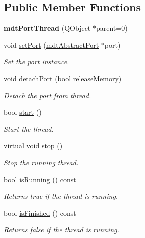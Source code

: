 \subsection*{Public Member Functions}
\begin{DoxyCompactItemize}
\item 
\hypertarget{classmdt_port_thread_aa20869c68d7a016f9e547464f0d8b71e}{
{\bfseries mdtPortThread} (QObject $\ast$parent=0)}
\label{classmdt_port_thread_aa20869c68d7a016f9e547464f0d8b71e}

\item 
void \hyperlink{classmdt_port_thread_acd51474c3a2683676423317bc9cb31b2}{setPort} (\hyperlink{classmdt_abstract_port}{mdtAbstractPort} $\ast$port)
\begin{DoxyCompactList}\small\item\em Set the port instance. \end{DoxyCompactList}\item 
void \hyperlink{classmdt_port_thread_a29b434534a5564efbd9dfe570a61b143}{detachPort} (bool releaseMemory)
\begin{DoxyCompactList}\small\item\em Detach the port from thread. \end{DoxyCompactList}\item 
bool \hyperlink{classmdt_port_thread_a9c45f260b8d58b7475151df79b3d8510}{start} ()
\begin{DoxyCompactList}\small\item\em Start the thread. \end{DoxyCompactList}\item 
virtual void \hyperlink{classmdt_port_thread_a5746ea96689ed80179751ad1353f0b39}{stop} ()
\begin{DoxyCompactList}\small\item\em Stop the running thread. \end{DoxyCompactList}\item 
bool \hyperlink{classmdt_port_thread_ae1becf17263dd9fbf5dfcc6c51eddd72}{isRunning} () const 
\begin{DoxyCompactList}\small\item\em Returns true if the thread is running. \end{DoxyCompactList}\item 
bool \hyperlink{classmdt_port_thread_a55d7ef615447823bf9878492a2c88fd4}{isFinished} () const 
\begin{DoxyCompactList}\small\item\em Returns false if the thread is running. \end{DoxyCompactList}\item 

\end{DoxyCompactItemize}
